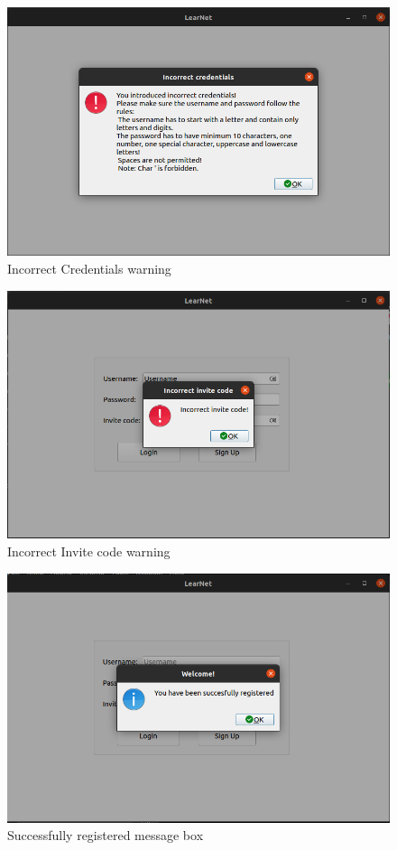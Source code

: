 \documentclass[runningheads]{llncs}
\begin{document}
\begin{figure}[H]
\includegraphics[width=\textwidth,height=\textheight,keepaspectratio]{images/incorrectCredentials.png}
\caption{Incorrect Credentials warning}
\end{figure}

\begin{figure}[H]
\includegraphics[width=\textwidth,height=\textheight,keepaspectratio]{images/incorrectInvitecode.png}
\caption{Incorrect Invite code warning}
\end{figure}

\begin{figure}[H]
\includegraphics[width=\textwidth,height=\textheight,keepaspectratio]{images/succesfullyRegistered.png}
\caption{Successfully registered message box}
\end{figure}
\end{document}
